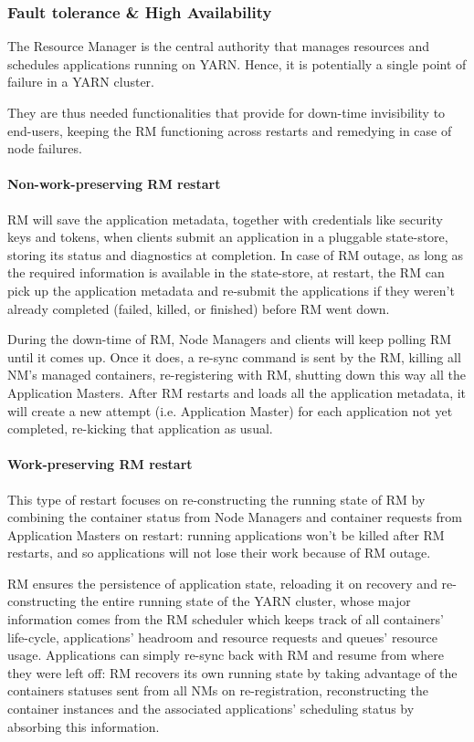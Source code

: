 \subsubsection{Fault tolerance \& High Availability}

The Resource Manager is the central authority that manages resources and schedules applications running on YARN. Hence, it is potentially a single point of failure in a YARN cluster. 

They are thus needed functionalities that provide for down-time invisibility to end-users, keeping the RM functioning across restarts and remedying in case of node failures.

\paragraph{Non-work-preserving RM restart} RM will save the application metadata, together with credentials like security keys and tokens, when clients submit an application in a pluggable state-store, storing its status and diagnostics at completion. In case of RM outage, as long as the required information is available in the state-store, at restart, the RM can pick up the application metadata and re-submit the applications if they weren't already completed (failed, killed, or finished) before RM went down.

During the down-time of RM, Node Managers and clients will keep polling RM until it comes up. Once it does, a re-sync command is sent by the RM, killing all NM's managed containers, re-registering with RM, shutting down this way all the Application Masters. After RM restarts and loads all the application metadata, it will create a new attempt (i.e. Application Master) for each application not yet completed, re-kicking that application as usual.

\paragraph{Work-preserving RM restart} This type of restart focuses on re-constructing the running state of RM by combining the container status from Node Managers and container requests from Application Masters on restart: running applications won't be killed after RM restarts, and so applications will not lose their work because of RM outage. 

RM ensures the persistence of application state, reloading it on recovery and re-constructing the entire running state of the YARN cluster, whose major information comes from the RM scheduler which keeps track of all containers' life-cycle, applications' headroom and resource requests and queues' resource usage. 
Applications can simply re-sync back with RM and resume from where they were left off: RM recovers its own running state by taking advantage of the containers statuses sent from all NMs on re-registration, reconstructing the container instances and the associated applications' scheduling status by absorbing this information. 

